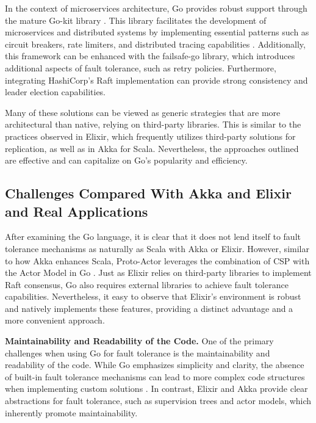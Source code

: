 
In the context of microservices architecture, Go provides robust support through the mature Go-kit library \cite{go-kit-docs}. This library facilitates the development of microservices and distributed systems by implementing essential patterns such as circuit breakers, rate limiters, and distributed tracing capabilities \cite{go-kit-docs, Shuiskov2022}. Additionally, this framework can be enhanced with the failsafe-go library, which introduces additional aspects of fault tolerance, such as retry policies. Furthermore, integrating HashiCorp's Raft implementation can provide strong consistency and leader election capabilities.

Many of these solutions can be viewed as generic strategies that are more architectural than native, relying on third-party libraries. This is similar to the practices observed in Elixir, which frequently utilizes third-party solutions for replication, as well as in Akka for Scala. Nevertheless, the approaches outlined are effective and can capitalize on Go's popularity and efficiency.

\subsection{Challenges Compared With Akka and Elixir and Real Applications}

After examining the Go language, it is clear that it does not lend itself to fault tolerance mechanisms as naturally as Scala with Akka or Elixir. However, similar to how Akka enhances Scala, Proto-Actor leverages the combination of CSP with the Actor Model in Go \cite{proto-actor-docs}. Just as Elixir relies on third-party libraries to implement Raft consensus, Go also requires external libraries to achieve fault tolerance capabilities. Nevertheless, it easy to observe that Elixir's environment is robust and natively implements these features, providing a distinct advantage and a more convenient approach.

\textbf{Maintainability and Readability of the Code.} One of the primary challenges when using Go for fault tolerance is the maintainability and readability of the code. While Go emphasizes simplicity and clarity, the absence of built-in fault tolerance mechanisms can lead to more complex code structures when implementing custom solutions \cite{go-docs}. In contrast, Elixir and Akka provide clear abstractions for fault tolerance, such as supervision trees and actor models, which inherently promote maintainability. 


